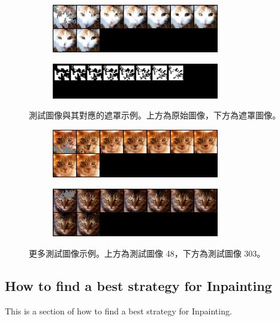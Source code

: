 \begin{figure}[h]
    \centering
    \begin{subfigure}{\textwidth}
        \centering
        \includegraphics[width=0.8\textwidth]{figures/test_69.png}
        \label{fig:test_69}
    \end{subfigure}
    \vspace{1cm}
    \begin{subfigure}{\textwidth}
        \centering
        \includegraphics[width=0.8\textwidth]{figures/mask_test_69.png}
        \label{fig:mask_test_69}
    \end{subfigure}
    \caption{測試圖像與其對應的遮罩示例。上方為原始圖像，下方為遮罩圖像。}
    \label{fig:test_and_mask}
\end{figure}


\begin{figure}[h]
    \centering
    \begin{subfigure}{\textwidth}
        \centering
        \includegraphics[width=0.8\textwidth]{figures/test_48.png}
        \label{fig:test_48}
    \end{subfigure}
    \vspace{1cm}
    \begin{subfigure}{\textwidth}
        \centering
        \includegraphics[width=0.8\textwidth]{figures/test_303.png}
        \label{fig:test_303}
    \end{subfigure}
    \caption{更多測試圖像示例。上方為測試圖像 48，下方為測試圖像 303。}
    \label{fig:test_examples}
\end{figure}




\subsection{How to find a best strategy for Inpainting}
This is a section of how to find a best strategy for Inpainting.



